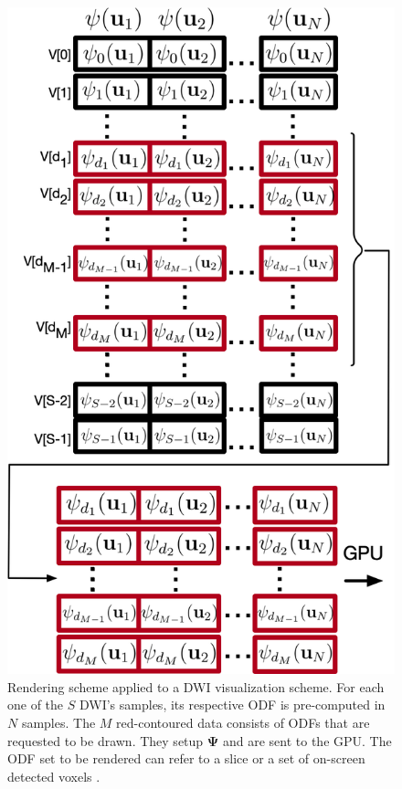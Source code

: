 \documentclass[twoside,twocolumn,10pt]{article}
\begin{document}

\begin{figure}[ht]
    \centering
    \includegraphics[width=0.89\linewidth, angle=0]{figs/rendering_scheme/organizacao2GPU_red1.png}
    \caption{Rendering scheme applied to a DWI visualization scheme. For each one of the $S$ DWI's samples, its respective ODF is pre-computed in $N$ samples. The $M$ red-contoured data consists of ODFs that are requested to be drawn. They setup $\bm{\Psi}$ and are sent to the GPU. The ODF set to be rendered can refer to a slice or a set of on-screen detected voxels \cite{voltoline2021}.}
    \label{fig::vmtk_precomputed2GPU}
\end{figure}
\end{document}
